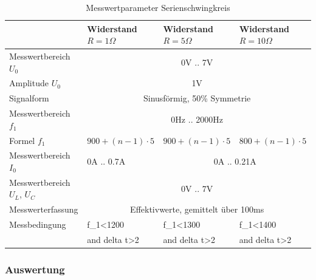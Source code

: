 \documentclass[12pt,a4paper]{article}
\begin{document}
\begin{table}[H]
	\centering
	\begin{tabular}{|l|l|l|l|}
		\hline
		&Widerstand $R=1\Omega$&Widerstand $R=5\Omega$&Widerstand $R=10\Omega$\\
		\hline
		Messwertbereich $U_0$&\multicolumn{3}{c|}{0V .. 7V}\\
		\hline
		Amplitude $U_0$&\multicolumn{3}{c|}{1V}\\
		\hline
		Signalform&\multicolumn{3}{c|}{Sinusförmig, 50\% Symmetrie}\\
		\hline
		Messwertbereich $f_1$&\multicolumn{3}{c|}{0Hz .. 2000Hz}\\
		\hline
		Formel $f_1$&$900+(n-1)\cdot5$&$900+(n-1)\cdot5$&$800+(n-1)\cdot5$\\
		\hline
		Messwertbereich $I_0$&0A .. 0.7A&\multicolumn{2}{c|}{0A .. 0.21A}\\
		\hline
		Messwertbereich $U_L$, $U_C$&\multicolumn{3}{c|}{0V .. 7V}\\
		\hline
		Messwerterfassung&\multicolumn{3}{c|}{Effektivwerte, gemittelt über 100ms}\\
		\hline
		Messbedingung&f\_1<1200&f\_1<1300&f\_1<1400\\
		&and delta t>2&and delta t>2&and delta t>2\\
		\hline
	\end{tabular}
	\caption{Messwertparameter Serienschwingkreis}
	\label{table:Messwerterfassung_S}
\end{table}

\subsubsection{Auswertung}
\end{document}
